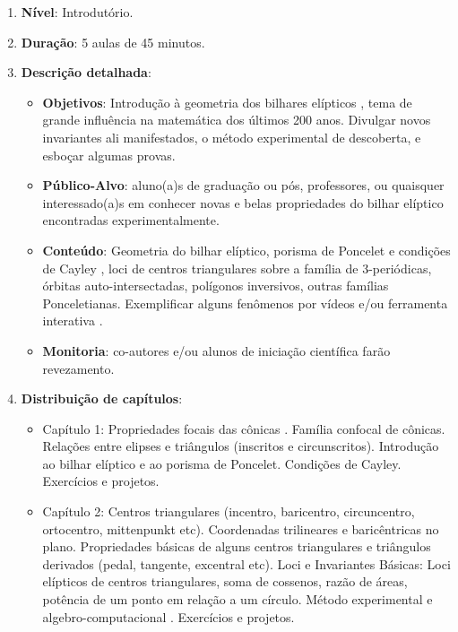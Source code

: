 \begin{enumerate}
    \item \textbf{Nível}: Introdutório.
    \item \textbf{Duração}: 5 aulas de 45 minutos.
    \item \textbf{Descrição detalhada}: 
    \begin{itemize}
        \item \textbf{Objetivos}: Introdução à geometria dos bilhares elípticos \cite{darboux1917,lebesgue1942,rozikov2018,sergei91}, tema de grande influência na matemática dos últimos 200 anos. Divulgar novos invariantes ali manifestados, o método experimental de descoberta, e esboçar algumas provas.
        \item \textbf{Público-Alvo}: aluno(a)s de graduação ou pós, professores, ou quaisquer interessado(a)s em conhecer novas e belas propriedades do bilhar elíptico encontradas experimentalmente.
        \item \textbf{Conteúdo}: Geometria do bilhar elíptico, porisma de Poncelet e condições de Cayley \cite{dragovic11}, loci de centros triangulares \cite{etc} sobre a fam\'ilia de 3-periódicas, órbitas auto-intersectadas, polígonos inversivos, outras famílias Ponceletianas. Exemplificar alguns fenômenos por vídeos \cite{reznik2020-youtube} e/ou ferramenta interativa \cite{reznik2020-app}.
        \item \textbf{Monitoria}: co-autores e/ou alunos de iniciação científica farão revezamento.
        \end{itemize}
        \item \textbf{Distribuição de capítulos}:
        \begin{itemize}
            \item  Capítulo 1: Propriedades focais das cônicas \cite{akopyan2007-conics,berger1987,darboux1917,lebesgue1942}. Família confocal de cônicas. Relações entre elipses e triângulos (inscritos e circunscritos). 
            Introdução ao bilhar elíptico e ao porisma de Poncelet.  Condições de Cayley.
             Exercícios e projetos.
            
            \item Capítulo 2:
             Centros triangulares (incentro, baricentro, circuncentro, ortocentro, mittenpunkt etc). Coordenadas trilineares e baricêntricas no plano. Propriedades básicas de alguns  centros triangulares  \cite{ coxeter67,   kimberling98} e triângulos derivados (pedal, tangente, excentral etc).
            Loci e Invariantes Básicas: Loci elípticos de centros triangulares, soma de cossenos, razão de áreas, potência de um ponto em relação a um círculo.  Método experimental e algebro-computacional \cite{  garcia2019-incenter, garcia2020-ellipses, garcia2020-new-properties}.
            Exercícios e projetos.
            

\end{itemize}
\end{enumerate}
